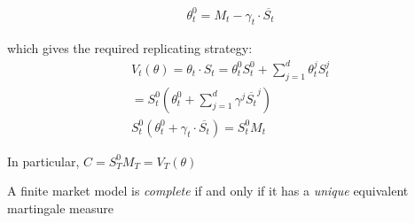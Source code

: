 \begin{prf}[]{}
\begin{equation*}
    \begin{gathered}
      \theta_t^0 = M_t-\gamma_t\cdot\overline{S_t}
    \end{gathered}
  \end{equation*}\par
  \noindent which gives the required replicating strategy:
  \begin{equation*}
    \begin{gathered}
      V_t(\theta) = \theta_t\cdot S_t = \theta_t^0S_t^0+\sum_{j=1}^{d}\theta_t^jS_t^j\\
      = S_t^0\left(\theta_t^0+\sum_{j=1}^{d}\gamma^j\overline{S_t}^j\right)\\
      S_t^0\left(\theta_t^0+\gamma_t\cdot\overline{S_t}\right) = S_t^0M_t
    \end{gathered}
  \end{equation*}
  \par\bigskip
  \noindent In particular, $C = S_T^0M_T = V_T(\theta)$
\end{prf}
\par\bigskip
\begin{theo}{}
  A finite market model is \textit{complete} if and only if it has a \textit{unique} equivalent martingale measure
\end{theo}
\par\bigskip
